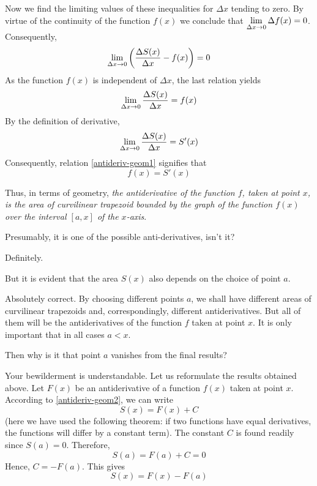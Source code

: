 Now we find the limiting values of these inequalities for $\Delta x$ tending to zero. By virtue of the continuity of the function $f (x)$ we conclude that $\lim\limits_{\Delta x \to 0} \Delta f (x) = 0$. Consequently,
\begin{equation*}%
\lmts{\Delta x}{0} \left(  \dfrac{\Delta S (x)}{ \Delta x}  - f (x) \right) = 0
\end{equation*}
As the function $f (x)$ is independent of $\Delta x$, the last relation yields
\begin{equation}%
\lmts{\Delta x}{0}  \dfrac{\Delta S (x)}{ \Delta x}  = f (x)
\label{antideriv-geom1}
\end{equation}
By the definition of derivative,
\begin{equation*}%
\lmts{\Delta x}{0}  \dfrac{\Delta S (x)}{ \Delta x}  = S' (x)
\end{equation*}
Consequently, relation \eqref{antideriv-geom1} signifies that
\begin{equation}%
 f (x)  = S' (x)
\label{antideriv-geom2}
\end{equation}

Thus, in terms of geometry, \emph{the antiderivative of the function $f$, taken at point $x$, is the area of curvilinear trapezoid bounded by the graph of the function $f (x)$ over the interval $[a, x]$ of the $x$-axis}.

\rdr Presumably, it is one of the possible anti-derivatives, isn't it?

\athr Definitely.

\rdr But it is evident that the area $S (x)$ also depends on the choice of point $a$.

\athr Absolutely correct. By choosing different points $a$, we shall have different areas of curvilinear trapezoids and, correspondingly, different antiderivatives. But all of them will be the antiderivatives of the function $f$ taken at point $x$. It is only important that in all cases $a < x$.

\rdr Then why is it that point $a$ vanishes from the final results?

\athr Your bewilderment is understandable. Let us reformulate the results obtained above. Let $F (x)$ be an antiderivative of a function $f (x)$ taken at point $x$. According to \eqref{antideriv-geom2}, we can write
\begin{equation*}%
S(x) = F(x) + C
\end{equation*}
(here we have used the following theorem: if two functions have equal derivatives, the functions will differ by a constant term). The constant $C$ is found readily since $S (a) = 0$. Therefore,
\begin{equation*}%
S (a) = F (a) + C = 0
\end{equation*}
Hence, $C = -F (a)$. This gives
\begin{equation}%
S(x)=F(x)- F(a)
\label{antideriv-geom3}
\end{equation}

